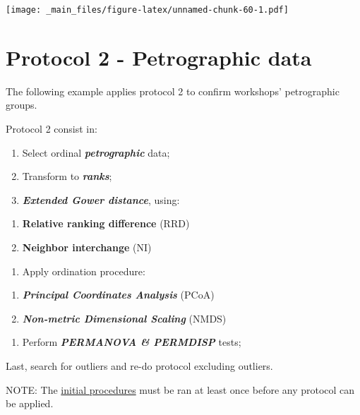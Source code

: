 \documentclass[12pt,]{book}
\providecommand{\tightlist}{%
  \setlength{\itemsep}{0pt}\setlength{\parskip}{0pt}}
\begin{document}
\texttt{[image: \_main\_files/figure-latex/unnamed-chunk-60-1.pdf]}

\hypertarget{prot2}{%
\chapter{Protocol 2 - Petrographic data}\label{prot2}}

The following example applies protocol 2 to confirm workshops' petrographic groups.

Protocol 2 consist in:

\begin{enumerate}
\def\labelenumi{\arabic{enumi}.}
\tightlist
\item
  Select ordinal \textbf{\emph{petrographic}} data;
\item
  Transform to \textbf{\emph{ranks}};
\item
  \textbf{\emph{Extended Gower distance}}, using:
\end{enumerate}

\begin{enumerate}
\def\labelenumi{\alph{enumi}.}
\tightlist
\item
  \textbf{Relative ranking difference} (RRD)
\item
  \textbf{Neighbor interchange} (NI)
\end{enumerate}

\begin{enumerate}
\def\labelenumi{\arabic{enumi}.}
\setcounter{enumi}{3}
\tightlist
\item
  Apply ordination procedure:
\end{enumerate}

\begin{enumerate}
\def\labelenumi{\alph{enumi}.}
\tightlist
\item
  \textbf{\emph{Principal Coordinates Analysis}} (PCoA)
\item
  \textbf{\emph{Non-metric Dimensional Scaling}} (NMDS)
\end{enumerate}

\begin{enumerate}
\def\labelenumi{\arabic{enumi}.}
\setcounter{enumi}{4}
\tightlist
\item
  Perform \textbf{\emph{PERMANOVA \& PERMDISP}} tests;
\end{enumerate}

Last, search for outliers and re-do protocol excluding outliers.

NOTE: The \protect\hyperlink{init}{initial procedures} must be ran at least once before any protocol can be applied.
\end{document}
